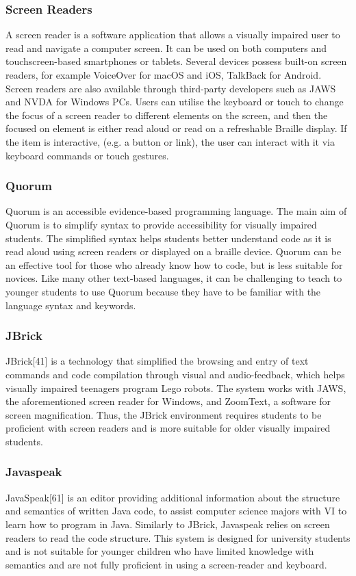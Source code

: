 \documentclass[oneside,%
                    author={Malak Hajji},
                    degree={BSc},
                    title={Designing An Accessible Computational Toolkit For Students},
                  subtitle={With Mixed Visual Abilities}]{dissertation}
\begin{document}
\subsubsection{Screen Readers}
A screen reader is a software application that allows a visually impaired user to read and navigate a computer screen. It can be used on both computers and touchscreen-based smartphones or tablets. Several devices possess built-on screen readers, for example VoiceOver for macOS and iOS, TalkBack for Android. Screen readers are also available through third-party developers such as JAWS and NVDA for Windows PCs. 
Users can utilise the keyboard or touch to change the focus of a screen reader to different elements on the screen, and then the focused on element is either read aloud or read on a refreshable Braille display. If the item is interactive, (e.g. a button or link), the user can interact with it via keyboard commands or touch gestures.

\subsubsection{Quorum}
Quorum is an accessible evidence-based programming language. The main aim of Quorum is to simplify syntax to provide accessibility for visually impaired students. The simplified syntax helps students better understand code as it is read aloud using screen readers or displayed on a braille device. Quorum can be an effective tool for those who already know how to code, but is less suitable for novices. Like many other text-based languages, it can be challenging to teach to younger students to use Quorum because they have to be familiar with the language syntax and keywords.

\subsubsection{JBrick}
JBrick[41] is a technology that simplified the browsing and entry of text commands and code compilation through visual and audio-feedback, which helps visually impaired teenagers program Lego robots. The system works with JAWS, the aforementioned screen reader for Windows, and ZoomText, a software for screen magnification. Thus, the JBrick environment requires students to be proficient with screen readers and is more suitable for older visually impaired students.

\subsubsection{Javaspeak}
JavaSpeak[61] is an editor providing additional information about the structure and semantics of written Java code, to assist computer science majors with VI to learn how to program in Java. Similarly to JBrick, Javaspeak  relies on screen readers to read the code structure. This system is designed for university students and is not suitable for younger children who have limited knowledge with semantics and are not fully proficient in using a screen-reader and keyboard.
\end{document}

